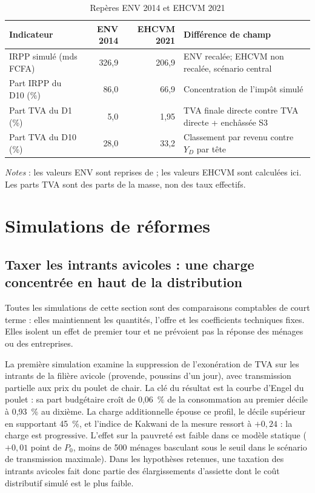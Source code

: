 \documentclass[11pt,a4paper]{article}
\begin{document}
\begin{table}[t]
\centering
\begin{threeparttable}
\caption{Repères ENV 2014 et EHCVM 2021}
\label{tab:akim}
\small
\begin{tabularx}{\textwidth}{lrrX}
\toprule
Indicateur & ENV 2014 & EHCVM 2021 & Différence de champ \\
\midrule
IRPP simulé (mds FCFA) & 326,9 & 206,9 &
ENV recalée; EHCVM non recalée, scénario central \\
Part IRPP du D10 (\%) & 86,0 & 66,9 &
Concentration de l'impôt simulé \\
Part TVA du D1 (\%) & 5,0 & 1,95 &
TVA finale directe contre TVA directe + enchâssée S3 \\
Part TVA du D10 (\%) & 28,0 & 33,2 &
Classement par revenu contre $Y_D$ par tête \\
\bottomrule
\end{tabularx}
\begin{tablenotes}\footnotesize
\item \emph{Notes} : les valeurs ENV sont reprises de \citet{akim2020}; les
valeurs EHCVM sont calculées ici. Les parts TVA sont des
parts de la masse, non des taux effectifs.
\end{tablenotes}
\end{threeparttable}
\end{table}

\section{Simulations de réformes}
\label{sec:reformes}

\subsection{Taxer les intrants avicoles : une charge concentrée en haut de la distribution}

Toutes les simulations de cette section sont des comparaisons comptables de
court terme : elles maintiennent les quantités, l'offre et les coefficients
techniques fixes. Elles isolent un effet de premier tour et ne prévoient pas la
réponse des ménages ou des entreprises.

La première simulation examine la suppression de l'exonération de TVA sur les
intrants de la filière avicole (provende, poussins d'un jour), avec
transmission partielle aux prix du poulet de chair. La clé du résultat est la
courbe d'Engel du poulet : sa part budgétaire croît de 0,06~\% de la
consommation au premier décile à 0,93~\% au dixième. La charge additionnelle
épouse ce profil, le décile supérieur en supportant 45~\%, et l'indice
de Kakwani de la mesure ressort à $+0,24$ : la charge est progressive. L'effet
sur la pauvreté est faible dans ce modèle statique ($+0,01$ point de $P_0$,
moins de 500 ménages basculant sous le seuil dans le scénario de transmission
maximale). Dans les hypothèses retenues, une taxation des intrants avicoles
fait donc
partie des élargissements d'assiette dont le coût distributif simulé est le plus
faible.
\end{document}
